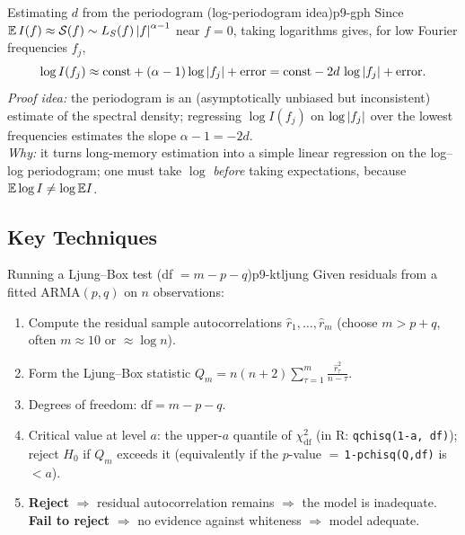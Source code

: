 \begin{proposition}{Estimating $d$ from the periodogram (log-periodogram idea)}{p9-gph}
Since $\mathbb{E}\,I(f)\approx \mathcal{S}(f)\sim L_S(f)\left\lvert f \right\rvert^{\alpha-1}$ near $f=0$, taking
logarithms gives, for low Fourier frequencies $f_j$,
\[
\log I(f_j) \approx \mathrm{const} + (\alpha-1)\log\left\lvert f_j \right\rvert + \text{error}
= \mathrm{const} - 2d\,\log\left\lvert f_j \right\rvert + \text{error}.
\]
\textit{Proof idea:} the periodogram is an (asymptotically unbiased but
inconsistent) estimate of the spectral density; regressing $\log I(f_j)$ on
$\log\left\lvert f_j \right\rvert$ over the lowest frequencies estimates the slope $\alpha-1=-2d$.\\
\textit{Why:} it turns long-memory estimation into a simple linear regression on
the log--log periodogram; one must take $\log$ \emph{before} taking expectations,
because $\mathbb{E}\log I\ne\log\mathbb{E} I$.
\end{proposition}

\subsection{Key Techniques}

\begin{keytech}{Running a Ljung--Box test (df $=m-p-q$)}{p9-ktljung}
Given residuals from a fitted ARMA$(p,q)$ on $n$ observations:
\begin{enumerate}
  \item Compute the residual sample autocorrelations $\hat r_1,\dots,\hat r_m$
        (choose $m>p+q$, often $m\approx 10$ or $\approx\log n$).
  \item Form the Ljung--Box statistic
        $\displaystyle Q_m=n(n+2)\sum_{\tau=1}^{m}\frac{\hat r_\tau^2}{n-\tau}$.
  \item Degrees of freedom: $\mathrm{df}=m-p-q$.
  \item Critical value at level $a$: the upper-$a$ quantile of
        $\chi^2_{\mathrm{df}}$ (in R: \texttt{qchisq(1-a, df)}); reject $H_0$ if
        $Q_m$ exceeds it (equivalently if the $p$-value
        $=\,$\texttt{1-pchisq(Q,df)} is $<a$).
  \item \textbf{Reject} $\Rightarrow$ residual autocorrelation remains
        $\Rightarrow$ the model is inadequate. \textbf{Fail to reject}
        $\Rightarrow$ no evidence against whiteness $\Rightarrow$ model adequate.
\end{enumerate}
\end{keytech}


